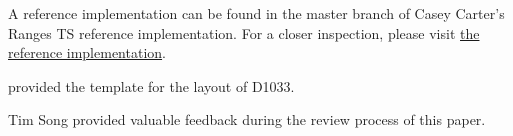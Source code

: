 \setcounter{chapter}{1}

A reference implementation can be found in the master branch of Casey Carter's Ranges TS reference
implementation. For a closer inspection, please visit
\href{https://github.com/CaseyCarter/cmcstl2/tree/master/include/stl2/detail/memory}{the reference implementation}.

\setcounter{chapter}{2}

 provided the template for the layout of
D1033.

Tim Song provided valuable feedback during the review process of this paper.
